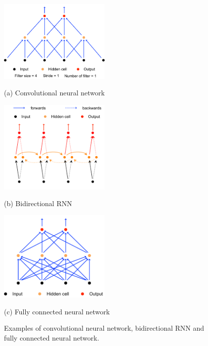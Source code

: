 \begin{figure}[htb]
\begin{minipage}[h]{1\linewidth}
\centering
\includegraphics[width=0.48\textwidth]{./chapters/chapter2/images/ConvANN.pdf}
\centerline{(a) Convolutional neural network}\medskip
\end{minipage}
\hfill
\begin{minipage}[h]{1\linewidth}
\centering
\includegraphics[width=0.48\textwidth]{./chapters/chapter2/images/BiRNN.pdf}
\centerline{(b) Bidirectional RNN}\medskip
\end{minipage}
\hfill
\begin{minipage}[h]{1\linewidth}
\centering
\includegraphics[width=0.48\textwidth]{./chapters/chapter2/images/fullyConn.pdf}
\centerline{(c) Fully connected neural network}\medskip
\end{minipage}
\caption{Examples of convolutional neural network, bidirectional RNN and fully connected neural network.}
\label{fig:AA3}
%
\end{figure}

